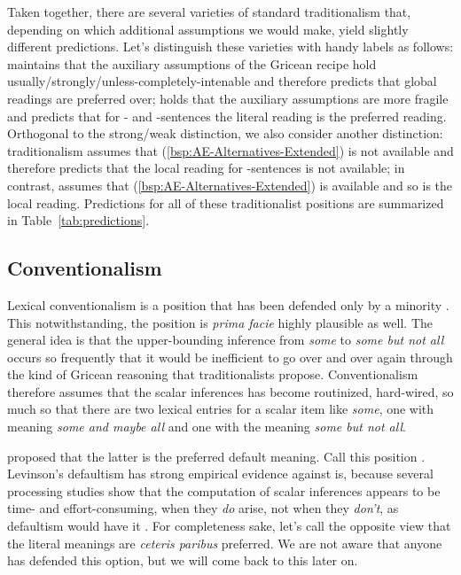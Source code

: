 \documentclass[fleqn,reqno,10pt,draft]{article}
\newcommand{\as}{\acro{as}}
\renewcommand{\es}{\acro{es}}
\newcommand{\mymark}[1]{{\color{mycol}{#1}}}
\begin{document}
Taken together, there are several varieties of standard traditionalism
that, depending on which additional assumptions we would make, yield
slightly different predictions. Let's distinguish these varieties with
handy labels as follows: \mymark{the strong variety of traditionalism}
maintains that the auxiliary assumptions of the Gricean recipe hold
usually/strongly/unless-completely-intenable and therefore predicts
that global readings are preferred over; \mymark{the weak variety of
  traditionalism} holds that the auxiliary assumptions are more
fragile and predicts that for \as- and \es-sentences the literal
reading is the preferred reading. Orthogonal to the strong/weak
distinction, we also consider another distinction: \mymark{restricted}
traditionalism assumes that (\ref{bsp:AE-Alternatives-Extended}) is
not available and therefore predicts that the local reading for
\as-sentences is not available; in contrast, \mymark{unrestricted
  traditionalism} assumes that (\ref{bsp:AE-Alternatives-Extended}) is
available and so is the local reading. Predictions for all of these
traditionalist positions are summarized in
Table~\ref{tab:predictions}.


\subsection{Conventionalism}
\label{sec:conventionalism}

Lexical conventionalism is a position that has been defended only by a
minority
\citep{LevinsonPresumptiveMeanings2000,Chierchia:2004_ScalarImplicatures}. This
notwithstanding, the position is \emph{prima facie} highly plausible
as well. The general idea is that the upper-bounding
inference from \emph{some} to \emph{some but not all} occurs so
frequently that it would be inefficient to go over and over again
through the kind of Gricean reasoning that traditionalists
propose. Conventionalism therefore assumes that the scalar inferences
has become routinized, hard-wired, so much so that there are two
lexical entries for a scalar item like \emph{some}, one with meaning
\emph{some and maybe all} and one with the meaning \emph{some but not
  all}. 

\citet{LevinsonPresumptiveMeanings2000} proposed that the latter is
the preferred default meaning. Call this position
\mymark{defaultism}. Levinson's defaultism has strong empirical
evidence against is, because several processing studies show that the
computation of scalar inferences appears to be time- and
effort-consuming, when they \emph{do} arise, not when they
\emph{don't}, as defaultism would have it
\citep[c.f.][]{BrehenyKatsos2006:Are-Generalised,BrehenyKatsos2008:Experimental-In}. For completeness sake, let's call
\mymark{literalism} the opposite view that the
literal meanings are \emph{ceteris paribus} preferred. We are not
aware that anyone has defended this option, but we will come back to
this later on.
\end{document}

